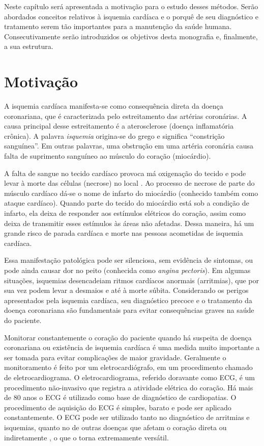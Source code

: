Neste capítulo será apresentada a motivação para o estudo desses métodos. Serão abordados conceitos relativos à isquemia cardíaca e o porquê de seu diagnóstico e tratamento serem tão importantes para a manutenção da saúde humana. Consecutivamente serão introduzidos os objetivos desta monografia e, finalmente, a sua estrutura.

\section{Motivação}

A isquemia cardíaca manifesta-se como consequência direta da doença coronariana, que é caracterizada pelo estreitamento das artérias coronárias. A causa principal desse estreitamento é a aterosclerose (doença inflamatória crônica). A palavra \emph{isquemia} origina-se do grego e significa ``constrição sanguínea''. Em outras palavras, uma obstrução em uma artéria coronária causa falta de suprimento sanguíneo ao músculo do coração (miocárdio).

A falta de sangue no tecido cardíaco provoca má oxigenação do tecido e pode levar à morte das células (necrose) no local \cite{Dubin2000}. Ao processo de necrose de parte do músculo cardíaco dá-se o nome de infarto do miocárdio (conhecido também como ataque cardíaco). Quando parte do tecido do miocárdio está sob a condição de infarto, ela deixa de responder aos estímulos elétricos do coração, assim como deixa de transmitir esses estímulos às áreas não afetadas. Dessa maneira, há um grande risco de parada cardíaca e morte nas pessoas acometidas de isquemia cardíaca.

Essa manifestação patológica pode ser silenciosa, sem evidência de sintomas, ou pode ainda causar dor no peito (conhecida como \emph{angina pectoris}). Em algumas situações, isquemias desencadeiam ritmos cardíacos anormais (arritmias), que por sua vez podem levar a desmaios e até à morte súbita. Considerando os perigos apresentados pela isquemia cardíaca, seu diagnóstico precoce e o tratamento da doença coronariana são fundamentais para evitar consequências graves na saúde do paciente. 

Monitorar constantemente o coração do paciente quando há suspeita de doença coronariana ou existência de isquemia cardíaca é uma medida muito importante a ser tomada para evitar complicações de maior gravidade. Geralmente o monitoramento é feito por um eletrocardiógrafo, em um procedimento chamado de eletrocardiograma. O eletrocardiograma, referido doravante como ECG, é um procedimento não-invasivo que registra a atividade elétrica do coração. Há mais de 80 anos o ECG é utilizado como base de diagnóstico de cardiopatias. O procedimento de aquisição do ECG é simples, barato e pode ser aplicado constantemente. O ECG pode ser utilizado tanto no diagnóstico de arritmias e isquemias, quanto no de outras doenças que afetam o coração direta ou indiretamente \cite{Fisch2000}, o que o torna extremamente versátil.

